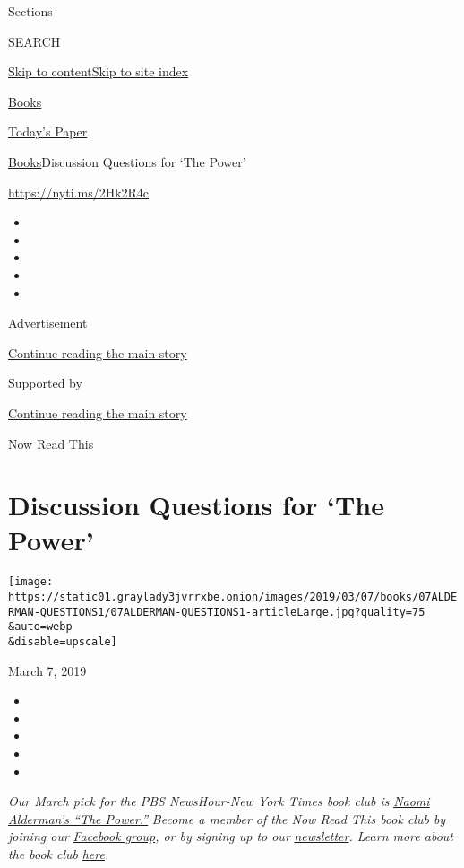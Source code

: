 Sections

SEARCH

\protect\hyperlink{site-content}{Skip to
content}\protect\hyperlink{site-index}{Skip to site index}

\href{https://www.nytimes3xbfgragh.onion/section/books}{Books}

\href{https://myaccount.nytimes3xbfgragh.onion/auth/login?response_type=cookie\&client_id=vi}{}

\href{https://www.nytimes3xbfgragh.onion/section/todayspaper}{Today's
Paper}

\href{/section/books}{Books}\textbar{}Discussion Questions for `The
Power'

\url{https://nyti.ms/2Hk2R4c}

\begin{itemize}
\item
\item
\item
\item
\item
\end{itemize}

Advertisement

\protect\hyperlink{after-top}{Continue reading the main story}

Supported by

\protect\hyperlink{after-sponsor}{Continue reading the main story}

Now Read This

\hypertarget{discussion-questions-for-the-power}{%
\section{Discussion Questions for `The
Power'}\label{discussion-questions-for-the-power}}

\texttt{[image: https://static01.graylady3jvrrxbe.onion/images/2019/03/07/books/07ALDERMAN-QUESTIONS1/07ALDERMAN-QUESTIONS1-articleLarge.jpg?quality=75\\\&auto=webp\\\&disable=upscale]}

March 7, 2019

\begin{itemize}
\item
\item
\item
\item
\item
\end{itemize}

\emph{Our March pick for the PBS NewsHour-New York Times book club is}
\href{https://www.nytimes3xbfgragh.onion/2017/10/25/books/review/naomi-alderman-power.html?rref=collection\%2Fspotlightcollection\%2Fnow-read-this\&action=click\&contentCollection=books\&region=rank\&module=package\&version=highlights\&contentPlacement=2\&pgtype=collection}{\emph{Naomi
Alderman's ``The Power.''}} \emph{Become a member of the Now Read This
book club by joining our}
\href{https://www.facebookcorewwwi.onion/groups/NowReadThisBookClub}{\emph{Facebook
group}}\emph{, or by signing up to our}
\href{https://pbs.us1.list-manage.com/subscribe?u=8aa1c620fd96b27384151c36e\&id=2fe6581b35}{\emph{newsletter}}\emph{.
Learn more about the book club}
\href{https://www.pbs.org/newshour/arts/what-is-now-read-this}{\emph{here}}\emph{.}

